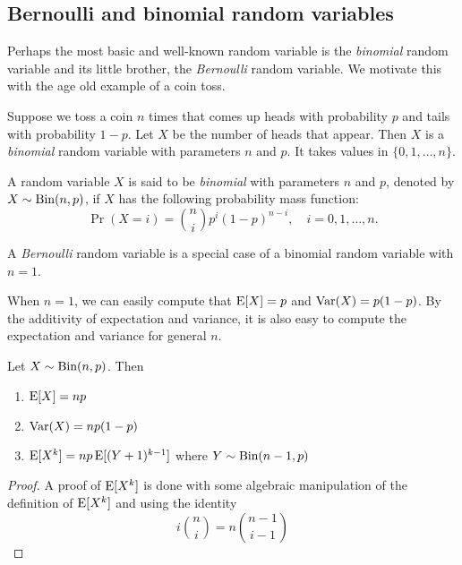 \documentclass{article}
\begin{document}
\subsection{Bernoulli and binomial random variables}

Perhaps the most basic and well-known random variable is the \emph{binomial} random variable and its little brother, the \emph{Bernoulli} random variable.
We motivate this with the age old example of a coin toss.

\begin{example}
  Suppose we toss a coin $n$ times that comes up heads with probability $p$ and tails with probability $1 - p$.
  Let $X$ be the number of heads that appear.
  Then $X$ is a \emph{binomial} random variable with parameters $n$ and $p$.
  It takes values in $\{0, 1, \ldots, n\}$.
\end{example}

\begin{definition}
  A random variable $X$ is said to be \emph{binomial} with parameters $n$ and $p$, denoted by $X \sim \textnormal{Bin}(n, p)$, if $X$ has the following probability mass function:
  \[
    \Pr(X = i) = \binom{n}{i} p^i (1 - p)^{n - i}, \quad i = 0, 1, \ldots, n.
  \]
\end{definition}

\begin{remark}
  A \emph{Bernoulli} random variable is a special case of a binomial random variable with $n = 1$.
\end{remark}

When $n = 1$, we can easily compute that $\operatorname{E}[X] = p$ and $\operatorname{Var}(X) = p(1 - p)$.
By the additivity of expectation and variance, it is also easy to compute the expectation and variance for general $n$.
\begin{theorem}
  Let $X \sim \textnormal{Bin}(n, p)$.
  Then
  \begin{enumerate}
    \item $\operatorname{E}[X] = np$
    \item $\operatorname{Var}(X) = np(1 - p)$
    \item $\operatorname{E}[X^k] = np \operatorname{E}[(Y + 1)^{k - 1}]$ where $Y \sim \textnormal{Bin}(n - 1, p)$
  \end{enumerate}
\end{theorem}

\begin{proof}
  A proof of $\operatorname{E}[X^k]$ is done with some algebraic manipulation of the definition of $\operatorname{E}[X^k]$ and using the identity
  \[
    i \binom{n}{i} = n \binom{n - 1}{i - 1}
  \]
\end{proof}
\end{document}
